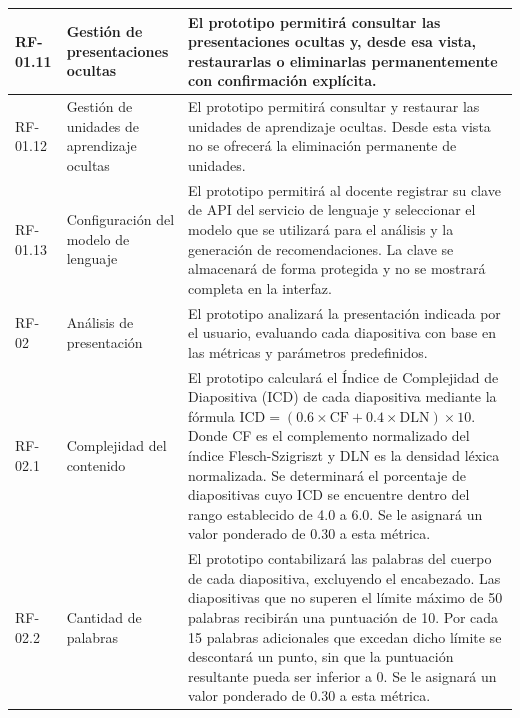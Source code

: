 \documentclass[11pt]{article}
\begin{document}
\begin{longtable}{|L{1.8cm}|L{4.2cm}|L{8.1cm}|}
        \hline
        RF-01.11 & Gestión de presentaciones ocultas & El prototipo permitirá consultar las presentaciones ocultas y, desde esa vista, restaurarlas o eliminarlas permanentemente con confirmación explícita. \\
        \hline
        RF-01.12 & Gestión de unidades de aprendizaje ocultas & El prototipo permitirá consultar y restaurar las unidades de aprendizaje ocultas. Desde esta vista no se ofrecerá la eliminación permanente de unidades. \\
        \hline
        RF-01.13 & Configuración del modelo de lenguaje & El prototipo permitirá al docente registrar su clave de API del servicio de lenguaje y seleccionar el modelo que se utilizará para el análisis y la generación de recomendaciones. La clave se almacenará de forma protegida y no se mostrará completa en la interfaz. \\
        \hline
        RF-02 & Análisis de presentación & El prototipo analizará la presentación indicada por el usuario, evaluando cada diapositiva con base en las métricas y parámetros predefinidos. \\
        \hline
        RF-02.1 & Complejidad del contenido & El prototipo calculará el Índice de Complejidad de Diapositiva (ICD) de cada diapositiva mediante la fórmula $\mathrm{ICD}=(0.6\times\mathrm{CF}+0.4\times\mathrm{DLN})\times10$. Donde CF es el complemento normalizado del índice Flesch-Szigriszt y DLN es la densidad léxica normalizada. Se determinará el porcentaje de diapositivas cuyo ICD se encuentre dentro del rango establecido de 4.0 a 6.0. Se le asignará un valor ponderado de 0.30 a esta métrica. \\
        \hline
        RF-02.2 & Cantidad de palabras & El prototipo contabilizará las palabras del cuerpo de cada diapositiva, excluyendo el encabezado. Las diapositivas que no superen el límite máximo de 50 palabras recibirán una puntuación de 10. Por cada 15 palabras adicionales que excedan dicho límite se descontará un punto, sin que la puntuación resultante pueda ser inferior a 0. Se le asignará un valor ponderado de 0.30 a esta métrica. \\
        \hline
\end{longtable}
\end{document}
